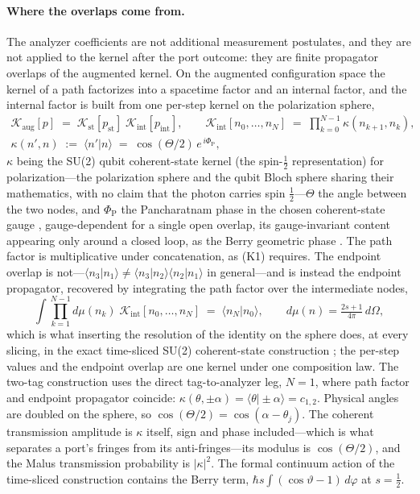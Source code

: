 \paragraph{Where the overlaps come from.} The analyzer coefficients are not additional measurement postulates, and they are not applied to the kernel after the port outcome: they are finite propagator overlaps of the augmented kernel. On the augmented configuration space the kernel of a path factorizes into a spacetime factor and an internal factor, and the internal factor is built from one per-step kernel on the polarization sphere,
\begin{equation}\label{eq:augkernel}
\begin{gathered}
\mathcal{K}_{\mathrm{aug}}[p] \;=\; \mathcal{K}_{\mathrm{st}}[p_{\mathrm{st}}]\; \mathcal{K}_{\mathrm{int}}[p_{\mathrm{int}}], \qquad \mathcal{K}_{\mathrm{int}}[n_0, \ldots, n_N] \;=\; \prod_{k=0}^{N-1} \kappa(n_{k+1}, n_k), \\[2pt]
\kappa(n', n) \;:=\; \langle n' \vert n \rangle \;=\; \cos(\Theta/2)\, e^{\,i\Phi_{\mathrm{P}}},
\end{gathered}
\end{equation}
$\kappa$ being the SU(2) qubit coherent-state kernel (the spin-$\tfrac12$ representation) for polarization---the polarization sphere and the qubit Bloch sphere sharing their mathematics, with no claim that the photon carries spin $\tfrac12$---$\Theta$ the angle between the two nodes, and $\Phi_{\mathrm{P}}$ the Pancharatnam phase in the chosen coherent-state gauge \cite{pancharatnam1956generalized}, gauge-dependent for a single open overlap, its gauge-invariant content appearing only around a closed loop, as the Berry geometric phase \cite{berry1984quantal}. The path factor is multiplicative under concatenation, as (K1) requires. The endpoint overlap is not---$\langle n_3 \vert n_1 \rangle \neq \langle n_3 \vert n_2 \rangle\langle n_2 \vert n_1 \rangle$ in general---and is instead the endpoint propagator, recovered by integrating the path factor over the intermediate nodes,
\begin{equation}\label{eq:endpoint}
\int \prod_{k=1}^{N-1} d\mu(n_k)\; \mathcal{K}_{\mathrm{int}}[n_0, \ldots, n_N] \;=\; \langle n_N \vert n_0 \rangle, \qquad d\mu(n) = \tfrac{2s+1}{4\pi}\, d\Omega,
\end{equation}
which is what inserting the resolution of the identity on the sphere does, at every slicing, in the exact time-sliced SU(2) coherent-state construction \cite{Kochetov1995}; the per-step values and the endpoint overlap are one kernel under one composition law. The two-tag construction uses the direct tag-to-analyzer leg, $N = 1$, where path factor and endpoint propagator coincide: $\kappa(\theta, \pm\alpha) = \langle \theta \vert \pm\alpha \rangle = c_{1,2}$. Physical angles are doubled on the sphere, so $\cos(\Theta/2) = \cos(\alpha - \theta_j)$. The coherent transmission amplitude is $\kappa$ itself, sign and phase included---which is what separates a port's fringes from its anti-fringes---its modulus is $\cos(\Theta/2)$, and the Malus transmission probability is $|\kappa|^2$. The formal continuum action of the time-sliced construction contains the Berry term, $\hbar s \int (\cos\vartheta - 1)\, d\varphi$ at $s = \tfrac12$.

